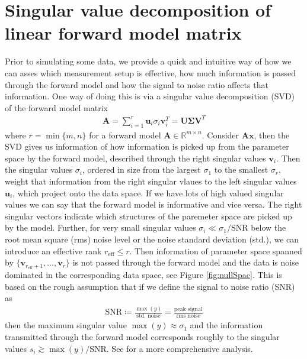 \section{Singular value decomposition of linear forward model matrix}
Prior to simulating some data, we provide a quick and intuitive way of how we can asses which measurement setup is effective, how much information is passed through the forward model and how the signal to noise ratio affects that information.
One way of doing this is via a singular value decomposition (SVD) of the forward model matrix
\begin{align}
	\bm{A} = \sum_{i =1}^{r} \bm{u}_i  \sigma_i \bm{v}^T_i = \bm{U} \bm{\Sigma} \bm{V}^T
\end{align}
where $r = \min\{m,n\}$ for a forward model $\bm{A} \in \mathbb{R}^{m \times n}$.
Consider $\bm{A}\bm{x}$, then the SVD gives us information of how information is picked up from the parameter space by the forward model, described through the right singular values $\bm{v}_i$.
Then the singular values $\sigma_i $, ordered in size from the largest $\sigma_1$ to the smallest $\sigma_{r}$, weight that information from the right singular vlaues to the left singular values $\bm{u}_i$, which project onto the data space.
If we have lots of high valued singular values we can say that the forward model is informative and vice versa.
The right singular vectors indicate which structures of the paremeter space are picked up by the model.
Further, for very small singular values $\sigma_i \ll \sigma_1/\text{SNR}$ below the root mean square (rms) noise level or the noise standard deviation (std.), we can introduce an effective rank $r_{\text{eff}} \leq r$.
Then information of parameter space spanned by $ \{\bm{v}_{r_{\text{eff}} +1}, \dots ,\bm{v}_r \}$ is not passed through the forward model and the data is noise dominated in the corresponding data space, see Figure \ref{fig:nullSpac}.
This is based on the rough assumption that if we define the signal to noise ratio (SNR) as
\begin{align}
	\text{SNR} \coloneqq \frac{\max(y)}{\text{std. noise}} = \frac{\text{peak signal}}{\text{rms noise}}
\end{align}
then the maximum singular value $\max(y) \approx \sigma_1$ and the information transmitted through the forward model corresponds roughly to the singular values $s_i \gtrsim \max(y)/ \text{SNR}$.
See \cite{tan2016LecNot} for a more comprehensive analysis.

